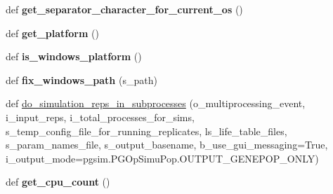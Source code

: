 \begin{DoxyCompactItemize}
\item 
def {\bfseries get\+\_\+separator\+\_\+character\+\_\+for\+\_\+current\+\_\+os} ()\hypertarget{namespacenegui_1_1pgutilities_a58912c5a49fed034b7899bae2763ea42}{}\label{namespacenegui_1_1pgutilities_a58912c5a49fed034b7899bae2763ea42}

\item 
def {\bfseries get\+\_\+platform} ()\hypertarget{namespacenegui_1_1pgutilities_a2086b2e2c5a53778e69925e7c9cb4ce5}{}\label{namespacenegui_1_1pgutilities_a2086b2e2c5a53778e69925e7c9cb4ce5}

\item 
def {\bfseries is\+\_\+windows\+\_\+platform} ()\hypertarget{namespacenegui_1_1pgutilities_afc489aeb6d08669a944cea475609c3ab}{}\label{namespacenegui_1_1pgutilities_afc489aeb6d08669a944cea475609c3ab}

\item 
def {\bfseries fix\+\_\+windows\+\_\+path} (s\+\_\+path)\hypertarget{namespacenegui_1_1pgutilities_a84406a87eec039d98e307a1e716b033d}{}\label{namespacenegui_1_1pgutilities_a84406a87eec039d98e307a1e716b033d}

\item 
def \hyperlink{namespacenegui_1_1pgutilities_a4f7afce1e7d58813a0f61aa406a87206}{do\+\_\+simulation\+\_\+reps\+\_\+in\+\_\+subprocesses} (o\+\_\+multiprocessing\+\_\+event, i\+\_\+input\+\_\+reps, i\+\_\+total\+\_\+processes\+\_\+for\+\_\+sims, s\+\_\+temp\+\_\+config\+\_\+file\+\_\+for\+\_\+running\+\_\+replicates, ls\+\_\+life\+\_\+table\+\_\+files, s\+\_\+param\+\_\+names\+\_\+file, s\+\_\+output\+\_\+basename, b\+\_\+use\+\_\+gui\+\_\+messaging=True, i\+\_\+output\+\_\+mode=pgsim.\+P\+G\+Op\+Simu\+Pop.\+O\+U\+T\+P\+U\+T\+\_\+\+G\+E\+N\+E\+P\+O\+P\+\_\+\+O\+N\+LY)
\item 
def {\bfseries get\+\_\+cpu\+\_\+count} ()\hypertarget{namespacenegui_1_1pgutilities_a651d0e76f36897c5ca20e6d40d1a46a7}{}\label{namespacenegui_1_1pgutilities_a651d0e76f36897c5ca20e6d40d1a46a7}


\end{DoxyCompactItemize}
